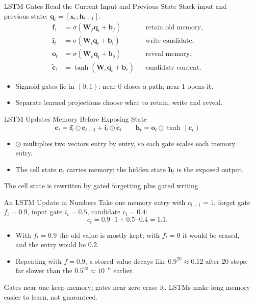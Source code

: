 \documentclass{ntuabeamer}
\begin{document}
\begin{frame}{LSTM Gates Read the Current Input and Previous State}
  Stack input and previous state: $\mathbf q_t=[\mathbf x_t;\mathbf h_{t-1}]$.
  \[
    \begin{aligned}
      \mathbf f_t&=\sigma(\mathbf W_f\mathbf q_t+\mathbf b_f)
        &&\text{retain old memory},\\
      \mathbf i_t&=\sigma(\mathbf W_i\mathbf q_t+\mathbf b_i)
        &&\text{write candidate},\\
      \mathbf o_t&=\sigma(\mathbf W_o\mathbf q_t+\mathbf b_o)
        &&\text{reveal memory},\\
      \widetilde{\mathbf c}_t&=\tanh(\mathbf W_c\mathbf q_t+\mathbf b_c)
        &&\text{candidate content}.
    \end{aligned}
  \]
  \begin{itemize}
    \item Sigmoid gates lie in $(0,1)$: near $0$ closes a path; near $1$ opens it.
    \item Separate learned projections choose what to retain, write and reveal.
  \end{itemize}
\end{frame}

\begin{frame}{LSTM Updates Memory Before Exposing State}
  \[
    \boxed{
      \mathbf{c}_t
      =\mathbf{f}_t\odot\mathbf{c}_{t-1}
      +\mathbf{i}_t\odot\widetilde{\mathbf{c}}_t
    }
    \qquad
    \boxed{
      \mathbf{h}_t
      =\mathbf{o}_t\odot\tanh(\mathbf{c}_t)
    }
  \]
  \begin{itemize}
    \item $\odot$ multiplies two vectors entry by entry, so each gate scales each memory entry.
    \item The cell state $\mathbf{c}_t$ carries memory; the hidden state $\mathbf{h}_t$ is the exposed output.
  \end{itemize}
  The cell state is rewritten by gated forgetting plus gated writing.
\end{frame}

\begin{frame}{An LSTM Update in Numbers}
  Take one memory entry with $c_{t-1}=1$, forget gate $f_t=0.9$, input gate $i_t=0.5$, candidate $\widetilde c_t=0.4$:
  \[
    c_t=0.9\cdot1+0.5\cdot0.4=1.1 .
  \]
  \begin{itemize}
    \item With $f_t=0.9$ the old value is mostly kept; with $f_t=0$ it would be erased, and the entry would be $0.2$.
    \item Repeating with $f=0.9$, a stored value decays like $0.9^{20}\approx0.12$ after $20$ steps: far slower than the $0.5^{20}\approx10^{-6}$ earlier.
  \end{itemize}
  Gates near one keep memory; gates near zero erase it. LSTMs make long memory easier to learn, not guaranteed.
\end{frame}
\end{document}
